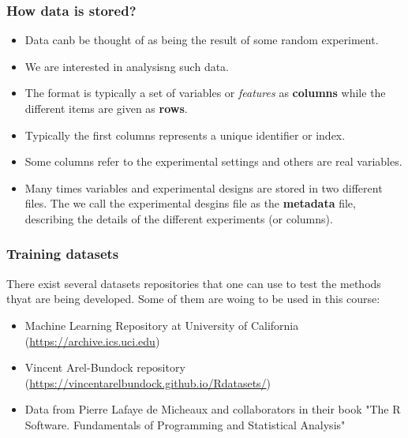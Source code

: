 \documentclass{beamer}
\begin{document}


\begin{frame}
\frametitle{How data is stored?}
\begin{itemize}
  \item Data canb be thought of as being the result of some random experiment.
  \item We are interested in analysisng such data.
  \item The format is typically a set of variables or {\em features} as {\bf columns} while the different items are given as {\bf rows}.
  \item Typically the first columns represents a unique identifier or index.
  \item Some columns refer to the experimental settings and others are real variables.
  \item Many times variables and experimental designs are stored in two different files. The we call the experimental desgins file as the {\bf metadata} file, describing the details of the different experiments (or columns).  
\end{itemize}
\end{frame}


\begin{frame}
\frametitle{Training datasets}
There exist several datasets repositories that one can use to test the methods thyat are being developed. Some of them are woing to be used in this course:
\begin{itemize}
\item Machine Learning Repository at University of California (\url{https://archive.ics.uci.edu})
\item Vincent Arel-Bundock repository (\url{https://vincentarelbundock.github.io/Rdatasets/})
\item Data from Pierre Lafaye de Micheaux and collaborators in their book  "The R Software. Fundamentals of Programming and Statistical Analysis" \cite{lafaye_de_micheaux_r_2013}
\end{itemize}
\end{frame}
\end{document}
